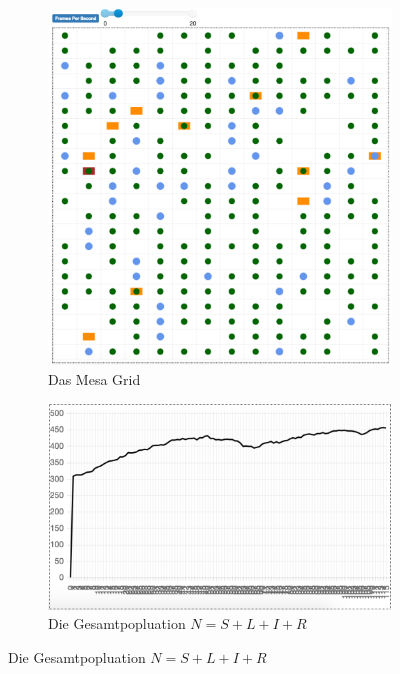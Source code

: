\documentclass[paper=a4, fontsize=11pt, ngerman, abstract=on]{scrartcl}
\numberwithin{equation}{section} %
\numberwithin{figure}{section} %
\numberwithin{table}{section} %
\begin{document}
\begin{figure}[ht]
  \centering
  \begin{subfigure}{.5\textwidth}
  \centering
  \includegraphics[width=.99\linewidth]{images/mesa-grid}
  \caption{Das Mesa Grid}
  \label{fig:mesa-grid}
\end{subfigure}%
  \begin{subfigure}{.5\textwidth}
  \centering
  \includegraphics[width=.99\linewidth]{images/n-population}
  \caption{Die Gesamtpopluation $N = S + L + I + R$}
  \label{fig:n-population}
  \end{subfigure}
\end{figure}
\end{document}
